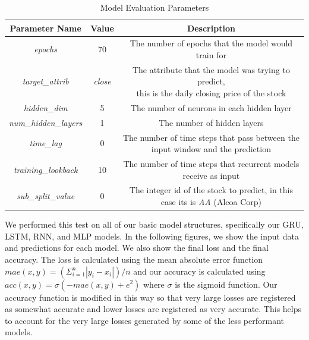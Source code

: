 \documentclass{article}
\begin{document}
    \begin{table}[H]
        \begin{center}
            \caption{{Model Evaluation Parameters}}
            \label{tab:evalParams}
            \bgroup
            \def\arraystretch{1.2}
            \begin{tabular}{|c|c|c|}
                \hline
                \textbf{Parameter Name} & \textbf{Value} & \textbf{Description}\\
                \hline
                \textit{epochs} & 70 & The number of epochs that the model would train for\\
                \hline
                \textit{target\_attrib} & \textit{close} & \makecell{The attribute that the model was trying to predict,\\this is the daily closing price of the stock}\\
                \hline
                \textit{hidden\_dim} & 5 & The number of neurons in each hidden layer\\
                \hline
                \textit{num\_hidden\_layers} & 1 & The number of hidden layers\\
                \hline
                \textit{time\_lag} & 0 & The number of time steps that pass between the input window and the prediction\\
                \hline
                \textit{training\_lookback} & 10 & The number of time steps that recurrent models receive as input\\
                \hline
                \textit{sub\_split\_value} & 0 & The integer id of the stock to predict, in this case its is \textit{AA} (Alcoa Corp)\\
                \hline
            \end{tabular}
            \egroup
        \end{center}
    \end{table}

    We performed this test on all of our basic model structures, specifically our GRU, LSTM, RNN, and MLP models.
    In the following figures, we show the input data and predictions for each model.  We also show the final loss
    and the final accuracy.  The loss is calculated using the mean absolute error function
    $mae(x, y) = (\Sigma^n_{i=1} |y_i - x_i|) / n$ and our accuracy is calculated using
    $acc(x, y) = \sigma(-mae(x, y)+e^2)$ where $\sigma$ is the sigmoid function.  Our accuracy function is modified
    in this way so that very large losses are registered as somewhat accurate and lower losses are registered as
    very accurate.  This helps to account for the very large losses generated by some of the less performant models.
\end{document}
